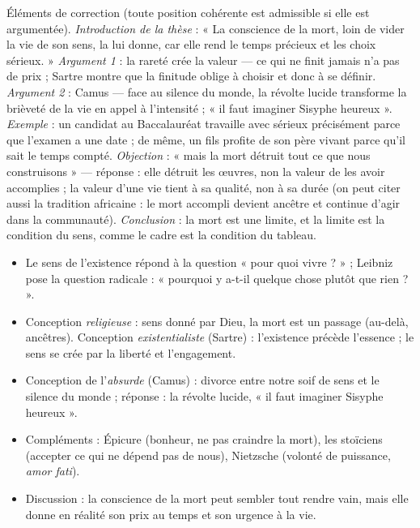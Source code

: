 \documentclass[11pt]{article}
\newcommand{\cle}[1]{{\popxbold\color{popdark}#1}}
\begin{document}
\begin{corrige}
Éléments de correction (toute position cohérente est admissible si elle est argumentée). \emph{Introduction de la thèse} : « La conscience de la mort, loin de vider la vie de son sens, la lui donne, car elle rend le temps précieux et les choix sérieux. » \emph{Argument 1} : la rareté crée la valeur — ce qui ne finit jamais n'a pas de prix ; Sartre montre que la finitude oblige à choisir et donc à se définir. \emph{Argument 2} : Camus — face au silence du monde, la révolte lucide transforme la brièveté de la vie en appel à l'intensité ; « il faut imaginer Sisyphe heureux ». \emph{Exemple} : un candidat au Baccalauréat travaille avec sérieux précisément parce que l'examen a une date ; de même, un fils profite de son père vivant parce qu'il sait le temps compté. \emph{Objection} : « mais la mort détruit tout ce que nous construisons » — réponse : elle détruit les œuvres, non la valeur de les avoir accomplies ; la valeur d'une vie tient à sa qualité, non à sa durée (on peut citer aussi la tradition africaine : le mort accompli devient ancêtre et continue d'agir dans la communauté). \emph{Conclusion} : la mort est une limite, et la limite est la condition du sens, comme le cadre est la condition du tableau.
\end{corrige}

\begin{aretenir}
\begin{itemize}
  \item Le \cle{sens de l'existence} répond à la question « pour quoi vivre ? » ; Leibniz pose la question radicale : « pourquoi y a-t-il quelque chose plutôt que rien ? ».
  \item Conception \emph{religieuse} : sens donné par Dieu, la mort est un passage (au-delà, ancêtres). Conception \emph{existentialiste} (Sartre) : l'existence précède l'essence ; le sens se crée par la liberté et l'engagement.
  \item Conception de l'\emph{absurde} (Camus) : divorce entre notre soif de sens et le silence du monde ; réponse : la révolte lucide, « il faut imaginer Sisyphe heureux ».
  \item Compléments : Épicure (bonheur, ne pas craindre la mort), les stoïciens (accepter ce qui ne dépend pas de nous), Nietzsche (volonté de puissance, \emph{amor fati}).
  \item Discussion : la conscience de la mort peut sembler tout rendre vain, mais elle donne en réalité son prix au temps et son urgence à la vie.
\end{itemize}
\end{aretenir}
\end{document}

